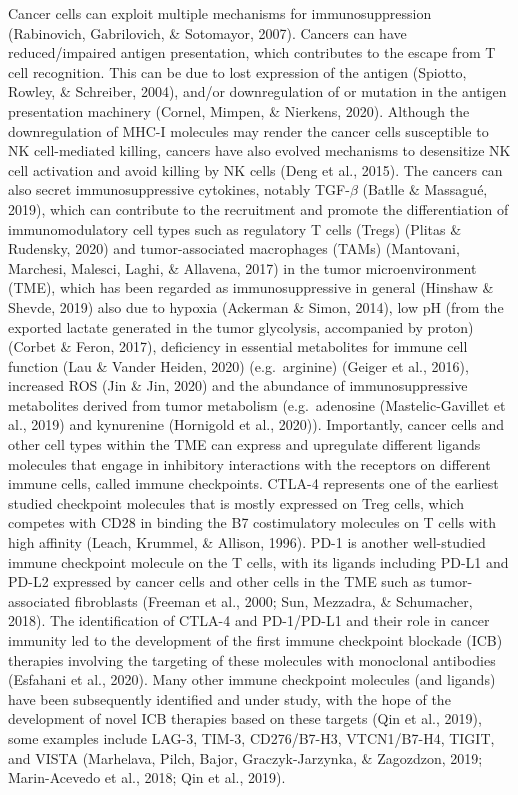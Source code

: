 \documentclass[12pt,twoside,openany,\mydriver]{thesis}  %
\begin{document}
Cancer cells can exploit multiple mechanisms for immunosuppression (Rabinovich, Gabrilovich, \& Sotomayor, 2007). Cancers can have reduced/impaired antigen presentation, which contributes to the escape from T cell recognition. This can be due to lost expression of the antigen (Spiotto, Rowley, \& Schreiber, 2004), and/or downregulation of or mutation in the antigen presentation machinery (Cornel, Mimpen, \& Nierkens, 2020). Although the downregulation of MHC-I molecules may render the cancer cells susceptible to NK cell-mediated killing, cancers have also evolved mechanisms to desensitize NK cell activation and avoid killing by NK cells (Deng et al., 2015). The cancers can also secret immunosuppressive cytokines, notably TGF-\(\beta\) (Batlle \& Massagué, 2019), which can contribute to the recruitment and promote the differentiation of immunomodulatory cell types such as regulatory T cells (Tregs) (Plitas \& Rudensky, 2020) and tumor-associated macrophages (TAMs) (Mantovani, Marchesi, Malesci, Laghi, \& Allavena, 2017) in the tumor microenvironment (TME), which has been regarded as immunosuppressive in general (Hinshaw \& Shevde, 2019) also due to hypoxia (Ackerman \& Simon, 2014), low pH (from the exported lactate generated in the tumor glycolysis, accompanied by proton) (Corbet \& Feron, 2017), deficiency in essential metabolites for immune cell function (Lau \& Vander Heiden, 2020) (e.g.~arginine) (Geiger et al., 2016), increased ROS (Jin \& Jin, 2020) and the abundance of immunosuppressive metabolites derived from tumor metabolism (e.g.~adenosine (Mastelic-Gavillet et al., 2019) and kynurenine (Hornigold et al., 2020)). Importantly, cancer cells and other cell types within the TME can express and upregulate different ligands molecules that engage in inhibitory interactions with the receptors on different immune cells, called immune checkpoints. CTLA-4 represents one of the earliest studied checkpoint molecules that is mostly expressed on Treg cells, which competes with CD28 in binding the B7 costimulatory molecules on T cells with high affinity (Leach, Krummel, \& Allison, 1996). PD-1 is another well-studied immune checkpoint molecule on the T cells, with its ligands including PD-L1 and PD-L2 expressed by cancer cells and other cells in the TME such as tumor-associated fibroblasts (Freeman et al., 2000; Sun, Mezzadra, \& Schumacher, 2018). The identification of CTLA-4 and PD-1/PD-L1 and their role in cancer immunity led to the development of the first immune checkpoint blockade (ICB) therapies involving the targeting of these molecules with monoclonal antibodies (Esfahani et al., 2020). Many other immune checkpoint molecules (and ligands) have been subsequently identified and under study, with the hope of the development of novel ICB therapies based on these targets (Qin et al., 2019), some examples include LAG-3, TIM-3, CD276/B7-H3, VTCN1/B7-H4, TIGIT, and VISTA (Marhelava, Pilch, Bajor, Graczyk-Jarzynka, \& Zagozdzon, 2019; Marin-Acevedo et al., 2018; Qin et al., 2019).
\end{document}
